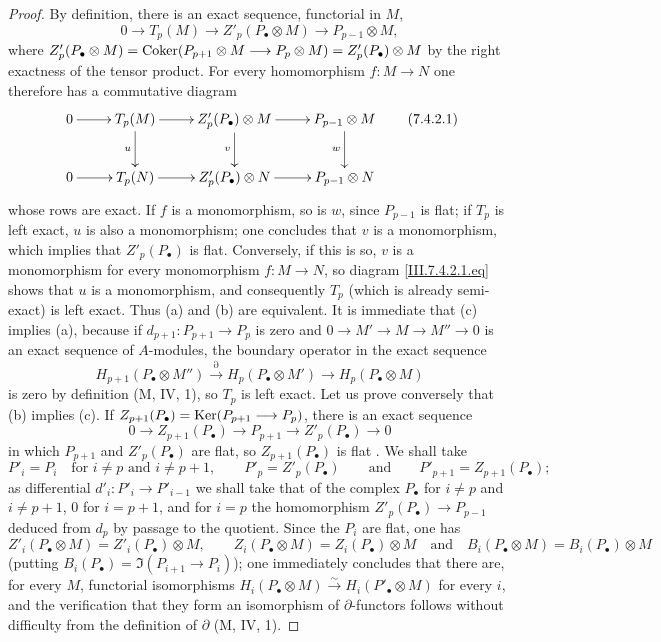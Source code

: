 \begin{proof}
By definition, there is an exact sequence, functorial in $M$,
\[
  0
  \longrightarrow
  T_p(M)
  \longrightarrow
  Z'_p(P_\bullet\otimes M)
  \longrightarrow
  P_{p-1}\otimes M,
\]
where $Z'_p(P_\bullet\otimes M)
=
\operatorname{Coker}(P_{p+1}\otimes M\longrightarrow
P_p\otimes M)
=
Z'_p(P_\bullet)\otimes M$
by the right exactness of the tensor product.  For every
homomorphism $f:M\to N$ one therefore has a commutative diagram
\[
\xymatrix{
  0 \ar[r]
    & T_p(M) \ar[r] \ar[d]_{u}
    & Z'_p(P_\bullet)\otimes M \ar[r] \ar[d]_{v}
    & P_{p-1}\otimes M \ar[d]_{w} \\
  0 \ar[r]
    & T_p(N) \ar[r]
    & Z'_p(P_\bullet)\otimes N \ar[r]
    & P_{p-1}\otimes N
}
\tag{7.4.2.1}\label{III.7.4.2.1.eq}
\]
whose rows are exact.  If $f$ is a monomorphism, so is $w$,
since $P_{p-1}$ is flat; if $T_p$ is left exact, $u$ is also a
monomorphism; one concludes that $v$ is a monomorphism, which
implies that $Z'_p(P_\bullet)$ is flat.  Conversely, if this is
so, $v$ is a monomorphism for every monomorphism $f:M\to N$, so
diagram \eqref{III.7.4.2.1.eq} shows that $u$ is a
monomorphism, and consequently $T_p$ (which is already
semi-exact) is left exact.  Thus (a) and (b) are equivalent.
It is immediate that (c) implies (a), because if
$d_{p+1}:P_{p+1}\to P_p$ is zero and
$0\to M'\to M\to M''\to0$ is an exact sequence of $A$-modules,
the boundary operator in the exact sequence
\[
  H_{p+1}(P_\bullet\otimes M'')
  \xrightarrow{\partial}
  H_p(P_\bullet\otimes M')
  \longrightarrow
  H_p(P_\bullet\otimes M)
\]
is zero by definition (M, IV, 1), so $T_p$ is left exact.  Let
us prove conversely that (b) implies (c).  If
$Z_{p+1}(P_\bullet)=\operatorname{Ker}(P_{p+1}\longrightarrow P_p)$, there
is an exact sequence
\[
  0\longrightarrow Z_{p+1}(P_\bullet)\longrightarrow P_{p+1}
  \longrightarrow Z'_p(P_\bullet)\longrightarrow0
\]
in which $P_{p+1}$ and $Z'_p(P_\bullet)$ are flat, so
$Z_{p+1}(P_\bullet)$ is flat .  We shall take
\[
  P'_i=P_i\quad\text{for }i\ne p\text{ and }i\ne p+1,
  \qquad
  P'_p=Z'_p(P_\bullet)
  \qquad\text{and}\qquad
  P'_{p+1}=Z_{p+1}(P_\bullet);
\]
as differential $d'_i:P'_i\to P'_{i-1}$ we shall take that of
the complex $P_\bullet$ for $i\ne p$ and $i\ne p+1$, $0$ for
$i=p+1$, and for $i=p$ the homomorphism
$Z'_p(P_\bullet)\to P_{p-1}$ deduced from $d_p$ by passage to
the quotient.  Since the $P_i$ are flat, one has
\[
  Z'_i(P_\bullet\otimes M)=Z'_i(P_\bullet)\otimes M,
  \qquad
  Z_i(P_\bullet\otimes M)=Z_i(P_\bullet)\otimes M
  \quad\text{and}\quad
  B_i(P_\bullet\otimes M)=B_i(P_\bullet)\otimes M
\]
(putting $B_i(P_\bullet)=\Im(P_{i+1}\to P_i)$); one immediately
concludes that there are, for every $M$, functorial isomorphisms
$H_i(P_\bullet\otimes M)\xrightarrow{\sim}H_i(P'_\bullet\otimes M)$
for every $i$, and the verification that they form an
isomorphism of $\partial$-functors follows without difficulty
from the definition of $\partial$ (M, IV, 1).
\end{proof}

